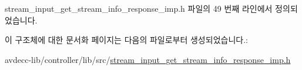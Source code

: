 stream\+\_\+input\+\_\+get\+\_\+stream\+\_\+info\+\_\+response\+\_\+imp.\+h 파일의 49 번째 라인에서 정의되었습니다.



이 구조체에 대한 문서화 페이지는 다음의 파일로부터 생성되었습니다.\+:\begin{DoxyCompactItemize}
\item 
avdecc-\/lib/controller/lib/src/\hyperlink{stream__input__get__stream__info__response__imp_8h}{stream\+\_\+input\+\_\+get\+\_\+stream\+\_\+info\+\_\+response\+\_\+imp.\+h}\end{DoxyCompactItemize}
